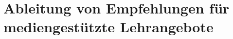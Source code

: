 \documentclass[150]{HSMW-Thesis}
\begin{document}
\chapter{Ableitung von Empfehlungen für mediengestützte Lehrangebote}


\Anhang
{}





\printglossary[title=Glossar]
\end{document}
